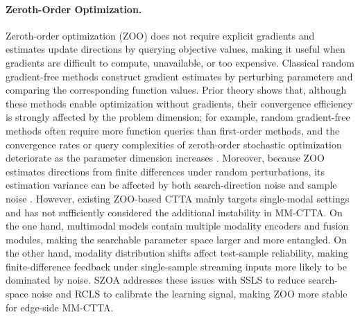 \paragraph{Zeroth-Order Optimization.}
Zeroth-order optimization (ZOO) does not require explicit gradients and estimates update directions by querying objective values, making it useful when gradients are difficult to compute, unavailable, or too expensive.
Classical random gradient-free methods construct gradient estimates by perturbing parameters and comparing the corresponding function values.
Prior theory shows that, although these methods enable optimization without gradients, their convergence efficiency is strongly affected by the problem dimension; for example, random gradient-free methods often require more function queries than first-order methods, and the convergence rates or query complexities of zeroth-order stochastic optimization deteriorate as the parameter dimension increases \citep{nesterov2017random,duchi2015optimal,shamir2013complexity}.
Moreover, because ZOO estimates directions from finite differences under random perturbations, its estimation variance can be affected by both search-direction noise and sample noise \citep{liu2018stochastic}.
However, existing ZOO-based CTTA mainly targets single-modal settings and has not sufficiently considered the additional instability in MM-CTTA.
On the one hand, multimodal models contain multiple modality encoders and fusion modules, making the searchable parameter space larger and more entangled.
On the other hand, modality distribution shifts affect test-sample reliability, making finite-difference feedback under single-sample streaming inputs more likely to be dominated by noise.
SZOA addresses these issues with SSLS to reduce search-space noise and RCLS to calibrate the learning signal, making ZOO more stable for edge-side MM-CTTA.
